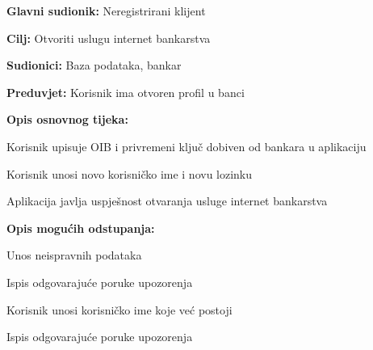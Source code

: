   				\noindent {}
  			\begin{packed_item}
  				
  				\item \textbf{Glavni sudionik: } Neregistrirani klijent
  				\item  \textbf{Cilj:} Otvoriti uslugu internet bankarstva
  				\item  \textbf{Sudionici:} Baza podataka, bankar
  				\item  \textbf{Preduvjet:} Korisnik ima otvoren profil u banci
  				\item  \textbf{Opis osnovnog tijeka:}
  				
  				\item[] \begin{packed_enum}
			
			\item Korisnik upisuje OIB i privremeni ključ dobiven od bankara u aplikaciju
			\item Korisnik unosi novo korisničko ime i novu lozinku
			\item Aplikacija javlja uspješnost otvaranja usluge internet bankarstva
			
		\end{packed_enum}
			
				\item  \textbf{Opis mogućih odstupanja:}
			
			\item[] \begin{packed_item}
				
				\item[1.a] Unos neispravnih podataka
				\item[] \begin{packed_enum}
					\item Ispis odgovarajuće poruke upozorenja
				\end{packed_enum}
				
				\item[2.a] Korisnik unosi korisničko ime koje već postoji
				\item[] \begin{packed_enum}
					\item Ispis odgovarajuće poruke upozorenja
				\end{packed_enum}
			
			\end{packed_item}
		
								
		
	\end{packed_item}		

